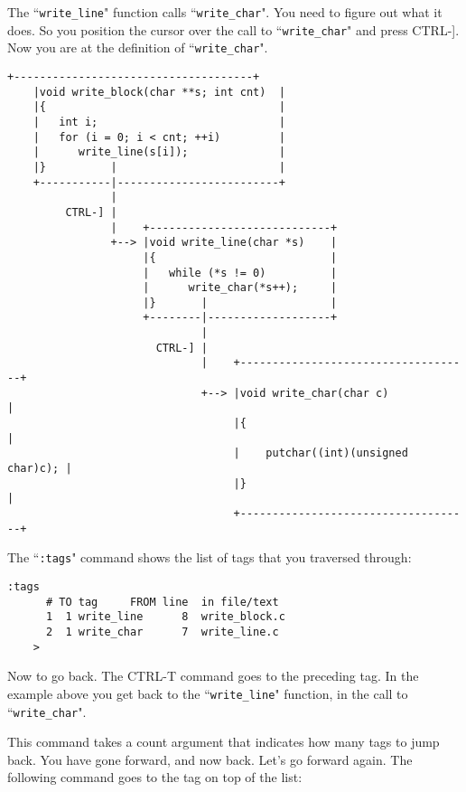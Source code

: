 The ``\texttt{write\_line}" function calls ``\texttt{write\_char}".
You need to figure out what it does.
So you position the cursor over the call to ``\texttt{write\_char}" and press CTRL-].
Now you are at the definition of ``\texttt{write\_char}".

\begin{Verbatim}[samepage=true]
    +-------------------------------------+
    |void write_block(char **s; int cnt)  |
    |{                                    |
    |   int i;                            |
    |   for (i = 0; i < cnt; ++i)         |
    |      write_line(s[i]);              |
    |}          |                         |
    +-----------|-------------------------+
                |
         CTRL-] |
                |    +----------------------------+
                +--> |void write_line(char *s)    |
                     |{                           |
                     |   while (*s != 0)          |
                     |      write_char(*s++);     |
                     |}       |                   |
                     +--------|-------------------+
                              |
                       CTRL-] |
                              |    +------------------------------------+
                              +--> |void write_char(char c)             |
                                   |{                                   |
                                   |    putchar((int)(unsigned char)c); |
                                   |}                                   |
                                   +------------------------------------+
\end{Verbatim}

The ``\texttt{:tags}" command shows the list of tags that you traversed through:

\begin{Verbatim}[samepage=true]
    :tags
      # TO tag     FROM line  in file/text
      1  1 write_line      8  write_block.c
      2  1 write_char      7  write_line.c
    >
\end{Verbatim}

Now to go back.
The CTRL-T command goes to the preceding tag.
In the example above you get back to the ``\texttt{write\_line}" function, in the call to ``\texttt{write\_char}".

This command takes a count argument that indicates how many tags to jump back.
You have gone forward, and now back.
Let's go forward again.
The following command goes to the tag on top of the list:

